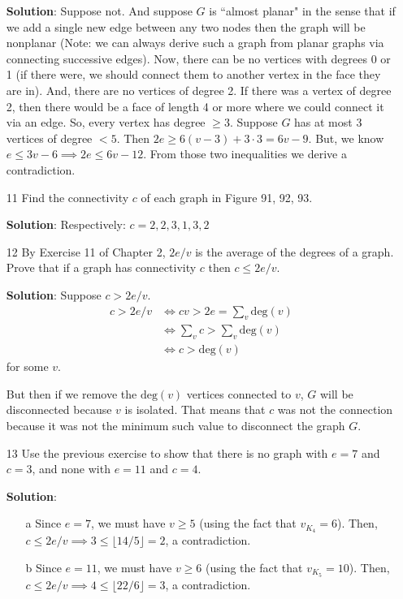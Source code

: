 \documentclass{article}
\newcommand\floor[1]{\lfloor#1\rfloor}
\begin{document}
\begin{enumerate}
	\textbf{Solution}: Suppose not. And suppose $G$ is ``almost planar" in the sense that if we add a single new edge between any two nodes then the graph will be nonplanar (Note: we can always derive such a graph from planar graphs via connecting successive edges). Now, there can be no vertices with degrees 0 or 1 (if there were, we should connect them to another vertex in the face they are in). And, there are no vertices of degree 2. If there was a vertex of degree 2, then there would be a face of length 4 or more where we could connect it via an edge. So, every vertex has degree $\geq 3$. Suppose $G$ has at most 3 vertices of degree $< 5$. Then $2e \geq 6(v - 3) + 3 \cdot 3 = 6v - 9$. But, we know $e \leq 3v - 6 \implies 2e \leq 6v - 12$. From those two inequalities we derive a contradiction.
	
	\item[11] Find the connectivity $c$ of each graph in Figure 91, 92, 93.
	
	\textbf{Solution}: Respectively: $c = 2, 2, 3, 1, 3, 2$
	
	\item[12] By Exercise 11 of Chapter 2, $2e/v$ is the average of the degrees of a graph. Prove that if a graph has connectivity $c$ then $c \leq 2e/v$.
	
	\textbf{Solution}: Suppose $c > 2e/v$.
	\begin{align}
		c > 2e/v 
		&\iff cv > 2e = \sum_{v} \mathrm{deg}(v) \\
		&\iff \sum_{v} c > \sum_{v} \mathrm{deg}(v)\\
		&\iff c > \mathrm{deg}(v)
	\end{align}
	for some $v$.
	
	But then if we remove the $\mathrm{deg}(v)$ vertices connected to $v$, $G$ will be disconnected because $v$ is isolated. That means that $c$ was not the connection because it was not the minimum such value to disconnect the graph $G$.
	
	\item[13] Use the previous exercise to show that there is no graph with $e = 7$ and $c = 3$, and none with $e = 11$ and $c = 4$.
	
	\textbf{Solution}:
		\begin{enumerate}
			\item[a] Since $e = 7$, we must have $v \geq 5$ (using the fact that $v_{K_4} = 6$). Then, $c \leq 2e/v \implies 3 \leq \floor{14/5} = 2$, a contradiction.
			\item[b] Since $e = 11$, we must have $v \geq 6$ (using the fact that $v_{K_5} = 10$). Then, $c \leq 2e/v \implies 4 \leq \floor{22/6} = 3$, a contradiction.
		\end{enumerate}
	

\end{enumerate}
\end{document}
